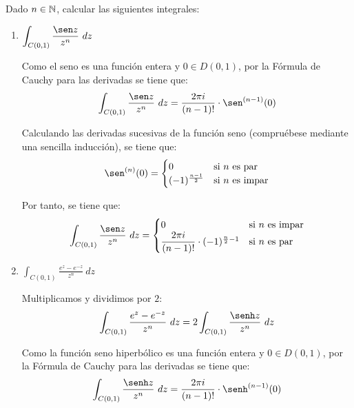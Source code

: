 \begin{ejercicio}
    Dado $n \in \mathbb{N}$, calcular las siguientes integrales:
    \begin{enumerate}
        \item $\displaystyle\int_{C(0,1)} \frac{\sen z}{z^n}\ dz$
        
        Como el seno es una función entera y $0\in D(0,1)$, por la Fórmula de Cauchy para las derivadas se tiene que:
        \begin{equation*}
            \int_{C(0,1)} \frac{\sen z}{z^n}\ dz = \dfrac{2\pi i}{(n-1)!}\cdot \sen^{(n-1)}(0)
        \end{equation*}

        Calculando las derivadas sucesivas de la función seno (compruébese mediante una sencilla inducción), se tiene que:
        \begin{equation*}
            \sen^{(n)}(0) = \begin{cases}
                0 & \text{si } n\text{ es par}\\
                (-1)^{\frac{n-1}{2}} & \text{si } n\text{ es impar}
            \end{cases}
        \end{equation*}

        Por tanto, se tiene que:
        \begin{equation*}
            \int_{C(0,1)} \frac{\sen z}{z^n}\ dz = \begin{cases}
                0 & \text{si } n\text{ es impar}\\
                \dfrac{2\pi i}{(n-1)!}\cdot (-1)^{\frac{n}{2}-1} & \text{si } n\text{ es par}
            \end{cases}
        \end{equation*}
        \item $\displaystyle\int_{C(0,1)} \frac{e^z - e^{-z}}{z^n}\ dz$
        
        Multiplicamos y dividimos por $2$:
        \begin{equation*}
            \int_{C(0,1)} \frac{e^z - e^{-z}}{z^n}\ dz = 2\int_{C(0,1)} \frac{\senh z}{z^n}\ dz
        \end{equation*}

        Como la función seno hiperbólico es una función entera y $0\in D(0,1)$, por la Fórmula de Cauchy para las derivadas se tiene que:
        \begin{equation*}
            \int_{C(0,1)} \frac{\senh z}{z^n}\ dz = \dfrac{2\pi i}{(n-1)!}\cdot \senh^{(n-1)}(0)
        \end{equation*}


\end{enumerate}
\end{ejercicio}

